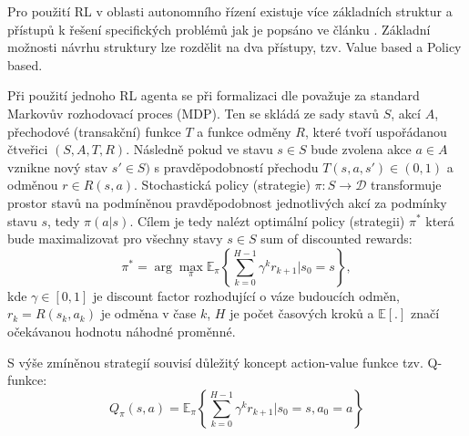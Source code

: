 \documentclass[czech, bc, kky, he, iso690numb]{fasthesis}
\begin{document}
            Pro použití RL v oblasti autonomního řízení existuje více základních struktur a přístupů k řešení specifických problémů jak je popsáno ve článku \cite{Deep_RL_survey}. Základní možnosti návrhu struktury lze rozdělit na dva přístupy, tzv. Value based a Policy based.
            
            Při použití jednoho RL agenta se při formalizaci dle \cite{Deep_RL_survey, RLbook} považuje za standard Markovův rozhodovací proces (MDP). Ten se skládá ze sady stavů \(S\), akcí \(A\), přechodové (transakční) funkce \(T\) a funkce odměny \(R\), které tvoří uspořádanou čtveřici \((S, A, T, R)\). Následně pokud ve stavu \(s \in S\) bude zvolena akce \(a \in A\) vznikne nový stav \(s' \in S)\) s pravděpodobností přechodu \(T(s,a,s') \in (0,1)\) a odměnou \(r \in R(s,a)\). Stochastická policy (strategie) \(\pi : S \rightarrow \mathscr{D}\) transformuje prostor stavů na podmíněnou pravděpodobnost jednotlivých akcí za podmínky stavu \(s\), tedy \(\pi(a|s)\). Cílem je tedy nalézt optimální policy (strategii) \(\pi^{*}\) která bude maximalizovat pro všechny stavy \(s \in S\) sum of discounted rewards:
            	\begin{equation}
            		\pi^{*} = \arg \max_{\pi} \mathbb{E}_{\pi} \left\{\sum_{k=0}^{H-1}\gamma^{k}r_{k+1} | s_{0}=s\right\},
            	\end{equation}
            kde \(\gamma \in [0,1]\) je discount factor rozhodující o váze budoucích odměn, \(r_{k}=R(s_{k}, a_{k})\) je odměna v čase \(k\), \(H\) je počet časových kroků a \(\mathbb{E} [.]\) značí očekávanou hodnotu náhodné proměnné.
            
            S výše zmíněnou strategií souvisí důležitý koncept action-value funkce tzv. Q-funkce:
            	\begin{equation}
            		Q_{\pi}(s,a) = \mathbb{E}_{\pi} \left\{\sum_{k=0}^{H-1}\gamma^{k}r_{k+1} | s_{0}=s, a_{0}=a\right\}
            		\label{eqn:Q-function}
            	\end{equation}
\end{document}
